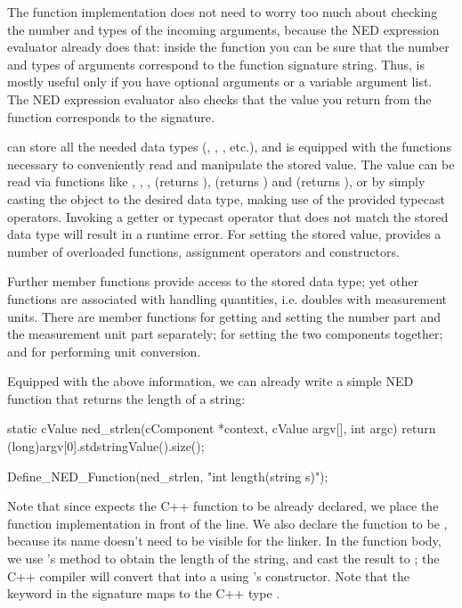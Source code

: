 The function implementation does not need to worry too much about checking
the number and types of the incoming arguments, because the NED expression
evaluator already does that: inside the function you can be sure that the
number and types of arguments correspond to the function signature string.
Thus,  is mostly useful only if you have optional arguments or a
variable argument list. The NED expression evaluator also checks that the
value you return from the function corresponds to the signature.

 can store all the needed data types (,
, , etc.), and is equipped with the functions
necessary to conveniently read and manipulate the stored value. The value can
be read via functions like , ,
,  (returns ),
 (returns ) and
 (returns ), or by simply casting the
object to the desired data type, making use of the provided typecast
operators. Invoking a getter or typecast operator that does not match the
stored data type will result in a runtime error. For setting the stored
value,  provides a number of overloaded 
functions, assignment operators and constructors.

Further  member functions provide access to the stored
data type; yet other functions are associated with handling quantities,
i.e. doubles with measurement units. There are member functions for getting
and setting the number part and the measurement unit part separately; for
setting the two components together; and for performing unit conversion.

Equipped with the above information, we can already write a simple NED function
that returns the length of a string:

\begin{cpp}
static cValue ned_strlen(cComponent *context, cValue argv[], int argc)
{
    return (long)argv[0].stdstringValue().size();
}

Define_NED_Function(ned_strlen, "int length(string s)");
\end{cpp}

Note that since  expects the C++ function to
be already declared, we place the function implementation in front of the
 line. We also declare the function to be
, because its name doesn't need to be visible for the linker.
In the function body, we use 's  method to
obtain the length of the string, and cast the result to ; the C++
compiler will convert that into a  using 's
 constructor. Note that the  keyword in the signature
maps to the C++ type .

